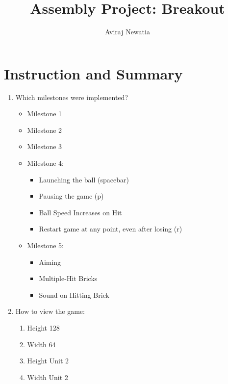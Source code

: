 \documentclass{article}
\title{Assembly Project: Breakout}
\author{Aviraj Newatia}
\begin{document}
\maketitle

\section{Instruction and Summary}

\begin{enumerate}

    \item Which milestones were implemented? 
    \begin{itemize}
    \item   Milestone 1
    \item   Milestone 2
    \item   Milestone 3
    \item   Milestone 4:
    \begin{itemize}
        \item Launching the ball (spacebar)
        \item Pausing the game (p)
        \item Ball Speed Increases on Hit
        \item Restart game at any point, even after losing (r)
    \end{itemize}
    \item Milestone 5:
    \begin{itemize}
        \item Aiming
        \item Multiple-Hit Bricks
        \item Sound on Hitting Brick
    \end{itemize}
    \end{itemize}

    \item How to view the game:
    
    \begin{enumerate}

    \item Height 128
    \item Width 64
    \item Height Unit 2
    \item Width Unit 2



\end{enumerate}
\end{enumerate}
\end{document}
